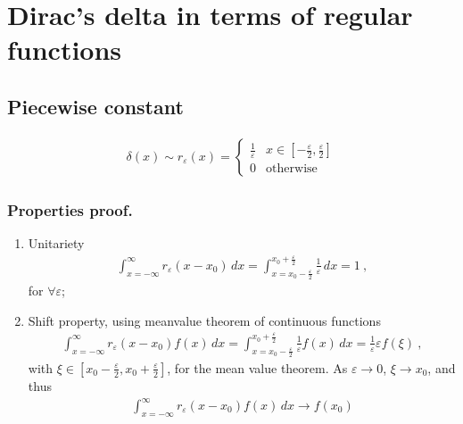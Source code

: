 \documentclass[letterpaper,10pt,english]{jupyterBook}
\begin{document}
\section{Dirac’s delta in terms of regular functions}
\label{\detokenize{ch/functional-analysis/dirac-delta:dirac-s-delta-in-terms-of-regular-functions}}\label{\detokenize{ch/functional-analysis/dirac-delta:functional-analysis-dirac-delta-approximations}}

\subsection{Piece\sphinxhyphen{}wise constant}
\label{\detokenize{ch/functional-analysis/dirac-delta:piece-wise-constant}}\label{\detokenize{ch/functional-analysis/dirac-delta:functional-analysis-dirac-delta-approximations-box}}\begin{equation*}
\begin{split}\delta(x) \sim r_{\varepsilon}(x) = \begin{cases} \frac{1}{\varepsilon} & x \in \left[-\frac{\varepsilon}{2}, \frac{\varepsilon}{2} \right] \\ 0 & \text{otherwise} \end{cases}\end{split}
\end{equation*}\subsubsection*{Properties \sphinxhyphen{} proof.}
\begin{enumerate}
%
\item {} 
\sphinxAtStartPar
Unitariety
\begin{equation*}
\begin{split}\int_{x=-\infty}^{\infty} r_{\varepsilon}(x-x_0) \, dx = \int_{x=x_0-\frac{\varepsilon}{2}}^{x_0+\frac{\varepsilon}{2}} \frac{1}{\varepsilon} \, dx = 1 \ ,  \end{split}
\end{equation*}
\sphinxAtStartPar
for \(\forall \varepsilon\);

\item {} 
\sphinxAtStartPar
Shift property, using mean\sphinxhyphen{}value theorem of continuous functions
\begin{equation*}
\begin{split}\int_{x=-\infty}^{\infty} r_{\varepsilon}(x-x_0) f(x) \, dx = \int_{x=x_0-\frac{\varepsilon}{2}}^{x_0+\frac{\varepsilon}{2}} \frac{1}{\varepsilon} f(x) \, dx = \frac{1}{\varepsilon} \varepsilon f(\xi) \ ,  \end{split}
\end{equation*}
\sphinxAtStartPar
with \(\xi \in \left[x_0-\frac{\varepsilon}{2}, x_0+\frac{\varepsilon}{2}\right]\), for the mean value theorem. As \(\varepsilon \rightarrow 0\), \(\xi \rightarrow x_0\), and thus
\begin{equation*}
\begin{split}\int_{x=-\infty}^{\infty} r_{\varepsilon}(x-x_0) f(x) \, dx \rightarrow f(x_0) \end{split}
\end{equation*}
\end{enumerate}
\end{document}
